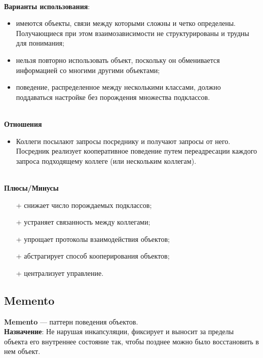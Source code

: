 \documentclass[a3paper,11pt]{report}
\begin{document}
\large\textbf{\\Варианты использования}:
\begin{itemize}
\item имеются объекты, связи между которыми сложны и четко определены. Получающиеся при этом взаимозависимости не структурированы и трудны для понимания;
\item нельзя повторно использовать объект, поскольку он обменивается информацией со многими другими объектами;
\item поведение, распределенное между несколькими классами, должно поддаваться настройке без порождения множества подклассов.
\end{itemize}


\textbf{\\Отношения}
\begin{itemize}
\item Коллеги посылают запросы посреднику и получают запросы от него. Посредник реализует кооперативное поведение путем переадресации каждого запроса подходящему коллеге (или нескольким коллегам).
\end{itemize}

\textbf{\\Плюсы/Минусы}
\begin{itemize}
\item [+] снижает число порождаемых подклассов;
\item [+] устраняет связанность между коллегами;
\item [+] упрощает протоколы взаимодействия объектов;
\item [+] абстрагирует способ кооперирования объектов;
\item [+] централизует управление.
\end{itemize}


\newpage
\subsection{Memento}

\large\textbf{Memento} --- паттерн поведения объектов.
\\
\large\textbf{Назначение}: Не нарушая инкапсуляции, фиксирует и выносит за пределы объекта его внутреннее состояние так, чтобы позднее можно было восстановить в нем объект.
\\
\end{document}
